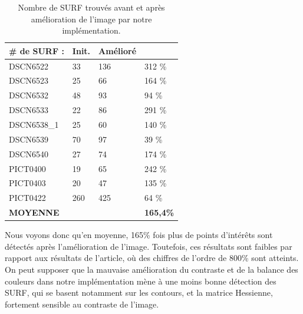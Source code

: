 \documentclass[twoside]{article}
\begin{document}
\begin{table}[H]
	\centering
    \begin{tabular}{llll}
    \# de SURF : &Init. &Amélioré\\
    \toprule
    DSCN6522     & 33       & 136        & 312 \%     \\
    DSCN6523     & 25       & 66         & 164 \%     \\
    DSCN6532     & 48       & 93         & 94 \%      \\
    DSCN6533     & 22       & 86         & 291 \%     \\
    DSCN6538\_1  & 25       & 60         & 140 \%     \\
    DSCN6539     & 70       & 97         & 39 \%      \\
    DSCN6540     & 27       & 74         & 174 \%     \\
    PICT0400     & 19       & 65         & 242 \%     \\
    PICT0403     & 20       & 47         & 135 \%     \\
    PICT0422     & 260      & 425        & 64 \%      \\
    \toprule
    \textbf{MOYENNE}        & &    & \textbf{165,4\%}      \\
    \end{tabular}
    \caption{Nombre de SURF trouvés avant et après amélioration de l'image par notre implémentation.}
\end{table}

Nous voyons donc qu'en moyenne, 165\% fois plus de points d'intérêts sont détectés après l'amélioration de l'image. Toutefois, ces résultats sont faibles par rapport aux résultats de l'article, où des chiffres de l'ordre de 800\% sont atteints. On peut supposer que la mauvaise amélioration du contraste et de la balance des couleurs dans notre implémentation mène à une moins bonne détection des SURF, qui se basent notamment sur les contours, et la matrice Hessienne, fortement sensible au contraste de l'image.
\end{document}
